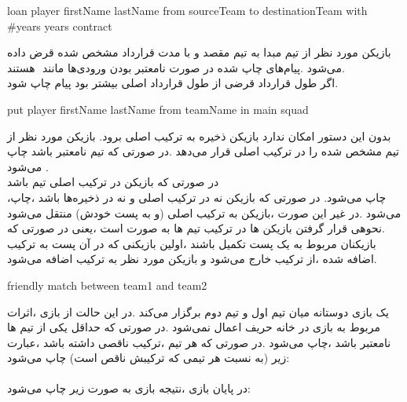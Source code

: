 \documentclass[]{article}
\begin{document}
\hrulefill

\begin{tcolorbox}[boxrule=0pt]
	\begin{latin}
		\large{
			loan player firstName lastName from sourceTeam to destinationTeam 
			with \#years years‬‬‬‬ contract
		}
	\end{latin}
\end{tcolorbox} 

ﺑﺎزﯾﮑﻦ ﻣﻮرد ﻧﻈﺮ از ﺗﯿﻢ ﻣﺒﺪا ﺑﻪ ﺗﯿﻢ ﻣﻘﺼﺪ و ﺑﺎ ﻣﺪت ﻗﺮارداد ﻣﺸﺨﺺ ﺷﺪه ﻗﺮض 
داده ﻣﯽﺷﻮد .‬ﭘﯿﺎمﻫﺎی ﭼﺎپ ﺷﺪه در ﺻﻮرت‬‬‬ ﻧﺎﻣﻌﺘﺒﺮ ﺑﻮدن ورودیﻫﺎ ﻣﺎﻧﻨﺪ 
‬ 
ﻫﺴﺘﻨﺪ.‬‬‬‬‬
\\
اﮔﺮ ﻃﻮل ﻗﺮارداد ﻗﺮﺿﯽ از ﻃﻮل ﻗﺮارداد اﺻﻠﯽ ﺑﯿﺸﺘﺮ ﺑﻮد ﭘﯿﺎم 
‬ﭼﺎپ ﺷﻮد.‬‬‬‬‬

\hrulefill
\begin{tcolorbox}[boxrule=0pt]
	\begin{latin}
		\large{
			put player firstName lastName from teamName in main squad‬‬‬‬
		}
	\end{latin}
\end{tcolorbox}
بدون این دستور امکان ندارد بازیکن ذخیره به ترکیب اصلی برود.
ﺑﺎزﯾﮑﻦ ﻣﻮرد ﻧﻈﺮ از ﺗﯿﻢ ﻣﺸﺨﺺ ﺷﺪه را در ﺗﺮﮐﯿﺐ اﺻﻠﯽ ﻗﺮار ﻣﯽدﻫﺪ .‬در ﺻﻮرﺗﯽ ﮐﻪ 
ﺗﯿﻢ ﻧﺎﻣﻌﺘﺒﺮ ﺑﺎﺷﺪ  ‬ﭼﺎپ‬‬‬‬
ﻣﯽﺷﻮد . \\
‬در ﺻﻮرﺗﯽ ﮐﻪ ﺑﺎزﯾﮑﻦ در ﺗﺮﮐﯿﺐ اﺻﻠﯽ ﺗﯿﻢ ﺑﺎﺷﺪ \\
،‬ﭼﺎپ ﻣﯽﺷﻮد.‬‬‬‬‬‬
در ﺻﻮرﺗﯽ ﮐﻪ ﺑﺎزﯾﮑﻦ ﻧﻪ در ﺗﺮﮐﯿﺐ اﺻﻠﯽ و ﻧﻪ در ذﺧﯿﺮهﻫﺎ ﺑﺎﺷﺪ 
،‬ﭼﺎپ ﻣﯽﺷﻮد .‬در ﻏﯿﺮ اﯾﻦ ﺻﻮرت ،‬ﺑﺎزﯾﮑﻦ‬‬‬‬‬
ﺑﻪ ﺗﺮﮐﯿﺐ اﺻﻠﯽ (و ﺑﻪ ﭘﺴﺖ ﺧﻮدش) ﻣﻨﺘﻘﻞ ﻣﯽﺷﻮد .‬ﻧﺤﻮهی ﻗﺮار ﮔﺮﻓﺘﻦ ﺑﺎزﯾﮑﻦ ﻫﺎ در 
ﺗﺮﮐﯿﺐ ﺗﯿﻢ ﻫﺎ ﺑﻪ ﺻﻮرت 
اﺳﺖ ،‬ﯾﻌﻨﯽ در ﺻﻮرﺗﯽ ﮐﻪ ﺑﺎزﯾﮑﻨﺎن ﻣﺮﺑﻮط ﺑﻪ ﯾﮏ ﭘﺴﺖ ﺗﮑﻤﯿﻞ ﺑﺎﺷﻨﺪ ،‬اوﻟﯿﻦ 
ﺑﺎزﯾﮑﻨﯽ ﮐﻪ در آن ﭘﺴﺖ ﺑﻪ ﺗﺮﮐﯿﺐ اﺿﺎﻓﻪ‬ ﺷﺪه ،‬از ﺗﺮﮐﯿﺐ ﺧﺎرج ﻣﯽﺷﻮد و ﺑﺎزﯾﮑﻦ 
ﻣﻮرد ﻧﻈﺮ ﺑﻪ ﺗﺮﮐﯿﺐ اﺿﺎﻓﻪ ﻣﯽﺷﻮد.

\hrulefill

\begin{tcolorbox}[boxrule=0pt]
	\begin{latin}
		\large{
			friendly match between team1 and team2‬‬‬‬
		}
	\end{latin}
\end{tcolorbox}

ﯾﮏ ﺑﺎزی دوﺳﺘﺎﻧﻪ ﻣﯿﺎن ﺗﯿﻢ اول و ﺗﯿﻢ دوم ﺑﺮﮔﺰار ﻣﯽﮐﻨﺪ .‬در اﯾﻦ ﺣﺎﻟﺖ از ﺑﺎزی 
،‬اﺛﺮات ﻣﺮﺑﻮط ﺑﻪ ﺑﺎزی در ﺧﺎﻧﻪ ﺣﺮﯾﻒ اﻋﻤﺎل ﻧﻤﯽﺷﻮد .‬در ﺻﻮرﺗﯽ ﮐﻪ ﺣﺪاﻗﻞ ﯾﮑﯽ 
از 
ﺗﯿﻢ ﻫﺎ ﻧﺎﻣﻌﺘﺒﺮ ﺑﺎﺷﺪ ،‬ﭼﺎپ ﻣﯽﺷﻮد .‬در ﺻﻮرﺗﯽ ﮐﻪ ﻫﺮ ﺗﯿﻢ 
،‬ﺗﺮﮐﯿﺐ‬‬‬‬‬‬‬‬‬
ﻧﺎﻗﺼﯽ داﺷﺘﻪ ﺑﺎﺷﺪ ،‬ﻋﺒﺎرت زﯾﺮ (ﺑﻪ ﻧﺴﺒﺖ ﻫﺮ ﺗﯿﻤﯽ ﮐﻪ ﺗﺮﮐﯿﺒﺶ ﻧﺎﻗﺺ اﺳﺖ) ﭼﺎپ 
ﻣﯽﺷﻮد:‬‬‬‬‬
\\
\\
در ﭘﺎﯾﺎن ﺑﺎزی ،‬ﻧﺘﯿﺠﻪ ﺑﺎزی ﺑﻪ ﺻﻮرت زﯾﺮ ﭼﺎپ ﻣﯽﺷﻮد:‬‬‬‬‬
\\
\end{document}
